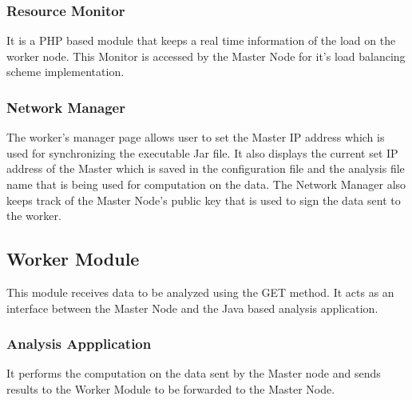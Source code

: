 \documentclass[AMA,STIX1COL]{WileyNJD-v2}
\begin{document}
\subsubsection{Resource Monitor}
It is a PHP based module that keeps a real time information of the load on the worker node. This Monitor is accessed by the Master Node for it's load balancing scheme implementation. 

\subsubsection{Network Manager}
The worker’s manager page allows user to set the Master IP address which is used for synchronizing the executable Jar file. It also displays the current set IP address of the Master which is saved in the configuration file and the analysis file name that is being used for computation on the data. The Network Manager also keeps track of the Master Node's public key that is used to sign the data sent to the worker.

\subsection{Worker Module}
This module receives data to be analyzed using the GET method. It acts as an interface between the Master Node and the Java based analysis application.

\subsubsection{Analysis Appplication}
It performs the computation on the data sent by the Master node and sends results to the Worker Module to be forwarded to the Master Node. 
\end{document}
